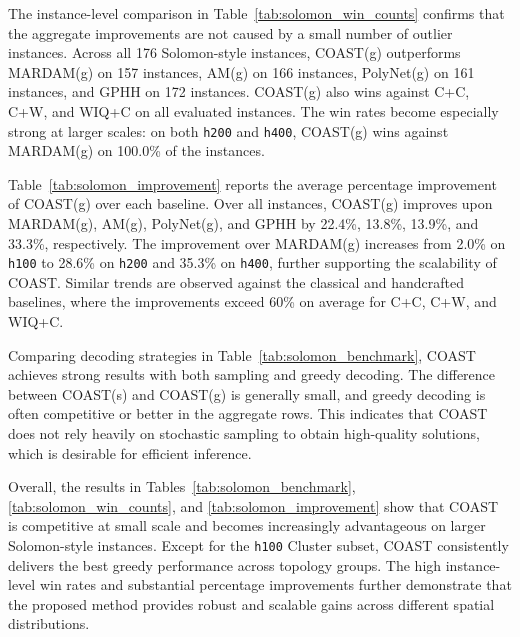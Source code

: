 \documentclass[letterpaper]{article}
\begin{document}
The instance-level comparison in Table~\ref{tab:solomon_win_counts} confirms that the aggregate improvements are not caused by a small number of outlier instances. Across all 176 Solomon-style instances, COAST(g) outperforms MARDAM(g) on 157 instances, AM(g) on 166 instances, PolyNet(g) on 161 instances, and GPHH on 172 instances. COAST(g) also wins against C+C, C+W, and WIQ+C on all evaluated instances. The win rates become especially strong at larger scales: on both \texttt{h200} and \texttt{h400}, COAST(g) wins against MARDAM(g) on 100.0\% of the instances.

Table~\ref{tab:solomon_improvement} reports the average percentage improvement of COAST(g) over each baseline. Over all instances, COAST(g) improves upon MARDAM(g), AM(g), PolyNet(g), and GPHH by 22.4\%, 13.8\%, 13.9\%, and 33.3\%, respectively. The improvement over MARDAM(g) increases from 2.0\% on \texttt{h100} to 28.6\% on \texttt{h200} and 35.3\% on \texttt{h400}, further supporting the scalability of COAST. Similar trends are observed against the classical and handcrafted baselines, where the improvements exceed 60\% on average for C+C, C+W, and WIQ+C.

Comparing decoding strategies in Table~\ref{tab:solomon_benchmark}, COAST achieves strong results with both sampling and greedy decoding. The difference between COAST(s) and COAST(g) is generally small, and greedy decoding is often competitive or better in the aggregate rows. This indicates that COAST does not rely heavily on stochastic sampling to obtain high-quality solutions, which is desirable for efficient inference.

Overall, the results in Tables~\ref{tab:solomon_benchmark}, \ref{tab:solomon_win_counts}, and \ref{tab:solomon_improvement} show that COAST is competitive at small scale and becomes increasingly advantageous on larger Solomon-style instances. Except for the \texttt{h100} Cluster subset, COAST consistently delivers the best greedy performance across topology groups. The high instance-level win rates and substantial percentage improvements further demonstrate that the proposed method provides robust and scalable gains across different spatial distributions.
\end{document}
